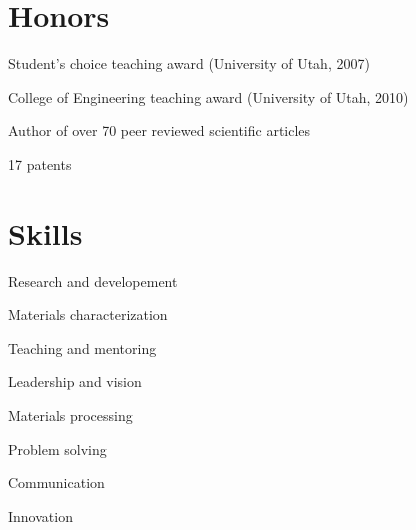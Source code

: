 \documentclass[letterpaper]{deedy-resume} %
\begin{document}
\begin{minipage}[t]{0.33\textwidth} %








\section{Honors}

\vspace{\topsep} %
\begin{tightitemize}
\item Student’s choice teaching award (University of Utah, 2007)
\item College of Engineering teaching award (University of Utah, 2010)
\item Author of over 70 peer reviewed scientific articles
\item 17 patents
\end{tightitemize}

\sectionspace
\sectionspace
\sectionspace
\sectionspace



\section{Skills}

\vspace{\topsep} %
\begin{tightitemize}
\item Research and developement
\item Materials characterization
\item Teaching and mentoring
\item Leadership and vision
\item Materials processing
\item Problem solving
\item Communication
\item Innovation
\end{tightitemize}


\end{minipage}
\end{document}
